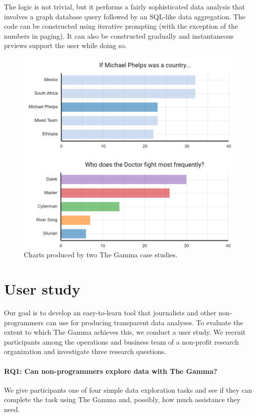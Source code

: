 \documentclass[manuscript,review,anonymous]{acmart}
\begin{document}
The logic is not trivial, but it performs a fairly sophisticated data analysis that involves a
graph database query followed by an SQL-like data aggregation. The code can be constructed
using iterative prompting (with the exception of the numbers in paging). It can also be constructed
gradually and instantaneous prviews support the user while doing so.

\begin{figure}
\centering
\includegraphics[width=1\columnwidth]{figures/cases}
\caption{Charts produced by two The Gamma case studies.}
\label{fig:cases}
\end{figure}


\section{User study}
\label{sec:study}

Our goal is to develop an easy-to-learn tool that journalists and other non-programmers can use
for producing transparent data analyses. To evaluate the extent to which The Gamma achieves this,
we conduct a user study. We recruit participants among the operations and business team of a
non-profit research organization and investigate three research questions.

\paragraph{RQ1: Can non-programmers explore data with The Gamma?}
We give participants one of four simple data exploration tasks and see if they can complete the
task using The Gamma and, possibly, how much assistance they need.
\end{document}
